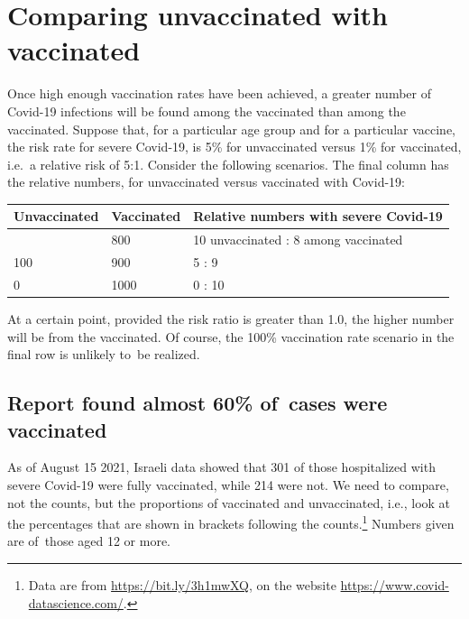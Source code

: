 \documentclass[
  10pt,
  b5paper]{book}
\begin{document}
\hypertarget{comparing-unvaccinated-with-vaccinated}{%
\section{Comparing unvaccinated with vaccinated}\label{comparing-unvaccinated-with-vaccinated}}

Once high enough vaccination rates have been achieved, a greater number of Covid-19 infections will be found among the vaccinated than among the vaccinated. Suppose that, for a particular age group and for a particular vaccine, the risk rate for severe Covid-19, is 5\% for unvaccinated versus 1\% for vaccinated, i.e.~a relative risk of 5:1. Consider the following scenarios. The final column has the relative numbers, for unvaccinated versus vaccinated with Covid-19:

\begin{longtable}[]{@{}lll@{}}
\toprule\noalign{}
Unvaccinated & Vaccinated & Relative numbers with severe Covid-19 \\
\midrule\noalign{}
\endhead
\bottomrule\noalign{}
\endlastfoot
200 & 800 & 10 unvaccinated : 8 among vaccinated \\
100 & 900 & 5 : 9 \\
0 & 1000 & 0 : 10 \\
\end{longtable}

At a certain point, provided the risk ratio is greater than 1.0, the higher number will be from the vaccinated. Of course, the 100\% vaccination rate scenario in the final row is unlikely to~be realized.

\hypertarget{report-found-almost-60-of-cases-were-vaccinated}{%
\subsection*{Report found almost 60\% of~cases were vaccinated}\label{report-found-almost-60-of-cases-were-vaccinated}}

As of August 15 2021, Israeli data showed that 301 of those hospitalized with severe Covid-19 were fully vaccinated, while 214 were not. We need to compare, not the counts, but the proportions of vaccinated and unvaccinated, i.e., look at the percentages that are shown in brackets following the counts.\footnote{Data are from \url{https://bit.ly/3h1mwXQ}, on the website \url{https://www.covid-datascience.com/}.} Numbers given are of~those aged 12 or more.
\end{document}
